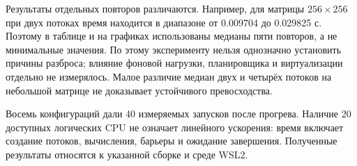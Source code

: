 Результаты отдельных повторов различаются. Например, для матрицы
\(256\times256\) при двух потоках время находится в диапазоне
от 0.009704 до 0.029825 с. Поэтому в таблице и на графиках
использованы медианы пяти повторов, а не минимальные значения.
По этому эксперименту нельзя однозначно установить причины разброса;
влияние фоновой нагрузки, планировщика и виртуализации отдельно
не измерялось. Малое различие медиан двух и четырёх потоков
на небольшой матрице не доказывает устойчивого превосходства.

Восемь конфигураций дали 40 измеряемых запусков после прогрева.
Наличие 20 доступных логических CPU не означает линейного ускорения:
время включает создание потоков, вычисления, барьеры и ожидание завершения.
Полученные результаты относятся к указанной сборке и среде WSL2.
\clearpage
\endgroup
